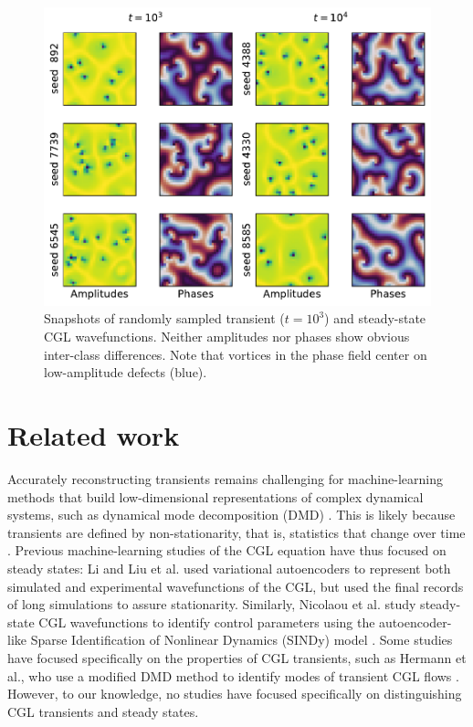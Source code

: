\documentclass[nofootinbib,pre,superscriptaddress,twocolumn,longbibliography,floatfix]{revtex4-2}
\begin{document}
\begin{figure}[h]
    \centering
    \includegraphics[width=1.0\linewidth]{../figures/samples_indistinguishable.pdf}
    \caption{Snapshots of randomly sampled transient ($t=10^3$) and steady-state CGL wavefunctions.
    Neither amplitudes nor phases show obvious inter-class differences.
    Note that vortices in the phase field center on low-amplitude defects (blue).}
    \label{fig:samples_indistinguishable}
\end{figure}

\section{Related work}
Accurately reconstructing transients remains challenging for machine-learning methods that build low-dimensional representations of complex dynamical systems,
such as dynamical mode decomposition (DMD) \cite{brunton2020machine}.
This is likely because transients are defined by non-stationarity,
that is, statistics that change over time \cite{said1984testing}.
Previous machine-learning studies of the CGL equation have thus focused on steady states:
Li and Liu et al. \cite{li2024measuring} used variational autoencoders to represent both simulated and experimental wavefunctions of the CGL,
but used the final records of long simulations to assure stationarity.
Similarly, Nicolaou et al. \cite{nicolaou2023data} study steady-state CGL wavefunctions to identify control parameters using the autoencoder-like
Sparse Identification of Nonlinear Dynamics (SINDy) model \cite{brunton2016discovering}.
Some studies have focused specifically on the properties of CGL transients,
such as Hermann et al., who use a modified DMD method to identify modes of transient CGL flows \cite{herrmann2021data}.
However, to our knowledge, no studies have focused specifically on distinguishing CGL transients and steady states.
\end{document}
